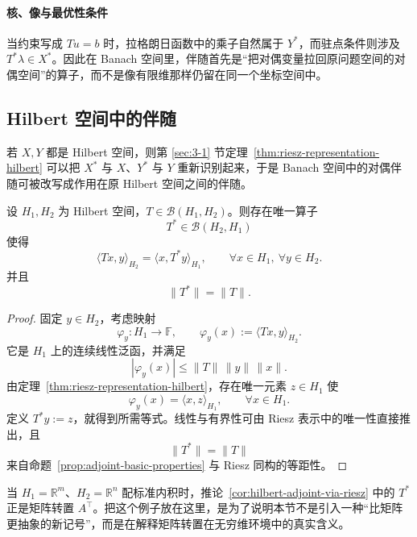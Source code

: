 \paragraph{核、像与最优性条件}

\begin{remark}
当约束写成 $Tu=b$ 时，拉格朗日函数中的乘子自然属于 $Y^\ast$，而驻点条件则涉及 $T^\ast\lambda\in X^\ast$。因此在 Banach 空间里，伴随首先是“把对偶变量拉回原问题空间的对偶空间”的算子，而不是像有限维那样仍留在同一个坐标空间中。
\end{remark}

\subsection{Hilbert 空间中的伴随}

若 $X,Y$ 都是 Hilbert 空间，则第 \ref{sec:3-1} 节定理~\ref{thm:riesz-representation-hilbert} 可以把 $X^\ast$ 与 $X$、$Y^\ast$ 与 $Y$ 重新识别起来，于是 Banach 空间中的对偶伴随可被改写成作用在原 Hilbert 空间之间的伴随。

\begin{corollary}\label{cor:hilbert-adjoint-via-riesz}
设 $H_1,H_2$ 为 Hilbert 空间，$T\in \mathcal B(H_1,H_2)$。则存在唯一算子
\[
T^\ast\in \mathcal B(H_2,H_1)
\]
使得
\[
\langle Tx,y\rangle_{H_2}=\langle x,T^\ast y\rangle_{H_1},
\qquad \forall x\in H_1,\ \forall y\in H_2.
\]
并且
\[
\|T^\ast\|=\|T\|.
\]
\end{corollary}

\begin{proof}
固定 $y\in H_2$，考虑映射
\[
\varphi_y\colon H_1\to \mathbb F,\qquad \varphi_y(x):=\langle Tx,y\rangle_{H_2}.
\]
它是 $H_1$ 上的连续线性泛函，并满足
\[
|\varphi_y(x)|\le \|T\|\,\|y\|\,\|x\|.
\]
由定理~\ref{thm:riesz-representation-hilbert}，存在唯一元素 $z\in H_1$ 使
\[
\varphi_y(x)=\langle x,z\rangle_{H_1},\qquad \forall x\in H_1.
\]
定义 $T^\ast y:=z$，就得到所需等式。线性与有界性可由 Riesz 表示中的唯一性直接推出，且
\[
\|T^\ast\|=\|T\|
\]
来自命题~\ref{prop:adjoint-basic-properties} 与 Riesz 同构的等距性。
\end{proof}

\begin{example}[矩阵转置作为伴随]\label{ex:matrix-transpose-adjoint}
当 $H_1=\mathbb R^m$、$H_2=\mathbb R^n$ 配标准内积时，推论~\ref{cor:hilbert-adjoint-via-riesz} 中的 $T^\ast$ 正是矩阵转置 $A^\top$。把这个例子放在这里，是为了说明本节不是引入一种“比矩阵更抽象的新记号”，而是在解释矩阵转置在无穷维环境中的真实含义。
\end{example}

